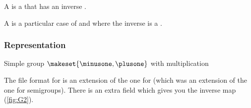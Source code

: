 
A \Group is a \Monoid that has an inverse \Mapping.


A \FiniteGroup is a particular case of \Group and \FiniteMonoid where the inverse is a \FiniteMap.


\subsubsection*{Representation}

\begin{marginfigure}%
    \caption{Simple group $\makeset{\minusone,\plusone}$ with multiplication}%
    \label{fig:G2}%
\end{marginfigure}%

The file format for  is an extension of the one for  (which was an extension of the one for semigroups).
There is an extra field  which gives you the inverse map (\cref{fig:G2}).


